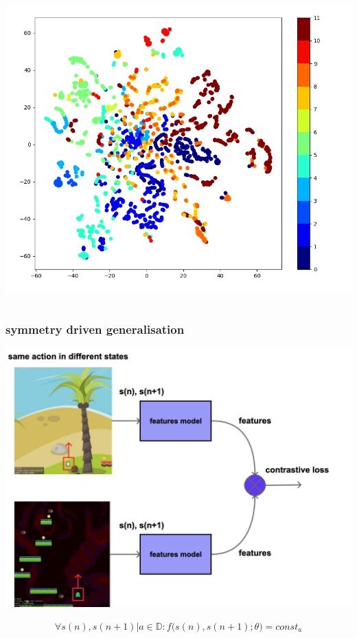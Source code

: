 \documentclass{beamer}
\begin{document}
\begin{frame}
\begin{columns}
    \begin{column}{0.5\textwidth}
      \centering
      \includegraphics[scale=0.2]{../images/snd_features.png}
    \end{column}
  
  \end{columns}

\end{frame}

\begin{frame}
  
  \frametitle{symmetry driven generalisation}

  \centering
  \includegraphics[scale=0.15]{../diagrams/symmetry/basic.png}

  \begin{align*}
    \forall s(n),s(n+1) \vert a \in \mathbb{D} : f \Big( s(n), s(n+1); \theta \Big) = const_a 
  \end{align*} 
  
\end{frame}
\end{document}
